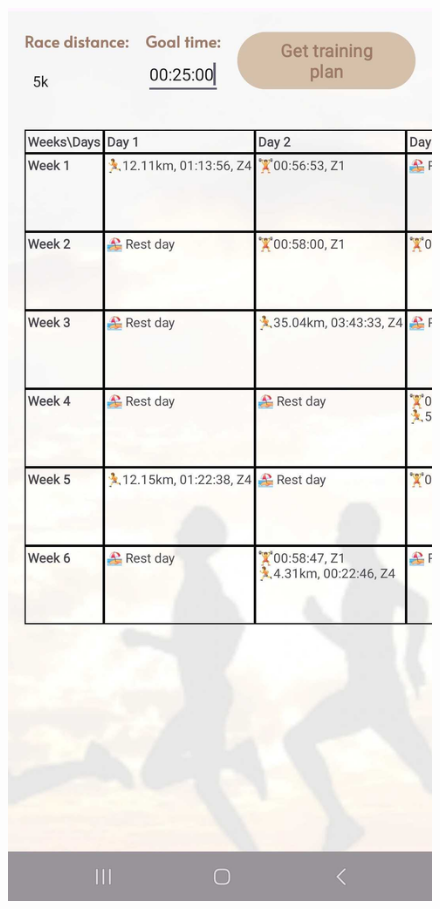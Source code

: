 \documentclass[12pt,oneside]{memoir}
\begin{document}
\begin{figure}[h]
\begin{minipage}{0.23\textwidth}
  \end{minipage}
  \hfill
  \begin{minipage}{0.23\textwidth}
    \centering
    \includegraphics[width=\textwidth]{assets/pictures/app_screenshots/training_plan_1.jpg}

\end{minipage}
\end{figure}
\end{document}
